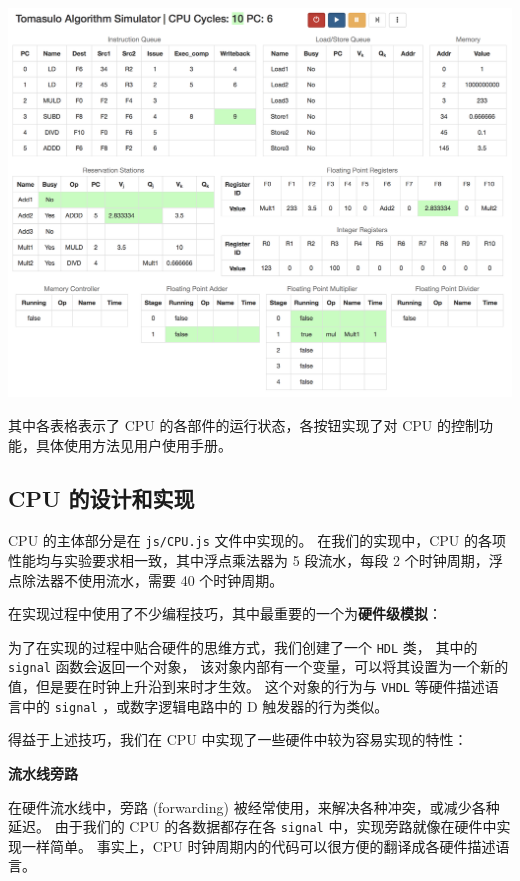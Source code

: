\documentclass[11pt, a4paper]{article}
\begin{document}
\begin{center}
\includegraphics[width=400pt]{images/screenshot-1.png}
\end{center}

其中各表格表示了 CPU 的各部件的运行状态，各按钮实现了对 CPU 的控制功能，具体使用方法见用户使用手册。

\subsection{CPU 的设计和实现}

CPU 的主体部分是在 \texttt{js/CPU.js} 文件中实现的。
在我们的实现中，CPU 的各项性能均与实验要求相一致，其中浮点乘法器为 5 段流水，每段 2 个时钟周期，浮点除法器不使用流水，需要 40 个时钟周期。

在实现过程中使用了不少编程技巧，其中最重要的一个为\textbf{硬件级模拟}：

为了在实现的过程中贴合硬件的思维方式，我们创建了一个 \texttt{HDL} 类，
其中的 \texttt{signal} 函数会返回一个对象，
该对象内部有一个变量，可以将其设置为一个新的值，但是要在时钟上升沿到来时才生效。
这个对象的行为与 \texttt{VHDL} 等硬件描述语言中的 \texttt{signal} ，或数字逻辑电路中的 D 触发器的行为类似。

得益于上述技巧，我们在 CPU 中实现了一些硬件中较为容易实现的特性：

\textbf{流水线旁路}

在硬件流水线中，旁路 (forwarding) 被经常使用，来解决各种冲突，或减少各种延迟。
由于我们的 CPU 的各数据都存在各 \texttt{signal} 中，实现旁路就像在硬件中实现一样简单。
事实上，CPU 时钟周期内的代码可以很方便的翻译成各硬件描述语言。
\end{document}
